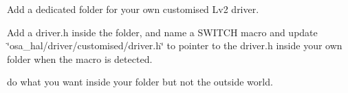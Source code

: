 
\begin{DoxyEnumerate}
\item Add a dedicated folder for your own customised Lv2 driver.
\item Add a driver.\+h inside the folder, and name a SWITCH macro and update \char`\"{}osa\+\_\+hal/driver/customised/driver.\+h\char`\"{} to pointer to the driver.\+h inside your own folder when the macro is detected.
\item do what you want inside your folder but not the outside world. 
\end{DoxyEnumerate}